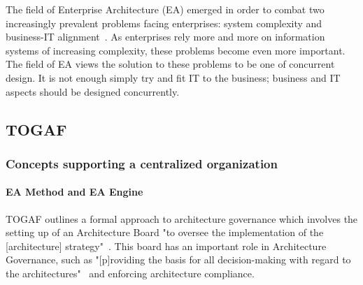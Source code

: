 The field of Enterprise Architecture (EA) emerged in order to combat two increasingly prevalent problems facing enterprises: system complexity and business-IT alignment~\cite{sessions2007}. As enterprises rely more and more on information systems of increasing complexity, these problems become even more important. The field of EA views the solution to these problems to be one of concurrent design. It is not enough simply try and fit IT to the business; business and IT aspects should be designed concurrently.
%
%   
%    

%

\subsection{TOGAF}

\subsubsection{Concepts supporting a centralized organization}

\paragraph*{EA Method and EA Engine}
TOGAF outlines a formal approach to architecture governance which involves the setting up of an Architecture Board "to oversee the implementation of the [architecture] strategy"~\cite[Ch. 47]{togaf9.1}. This board has an important role in Architecture Governance, such as "[p]roviding the basis for all decision-making with regard to the architectures"~\cite[Ch. 47]{togaf9.1} and enforcing architecture compliance. 



